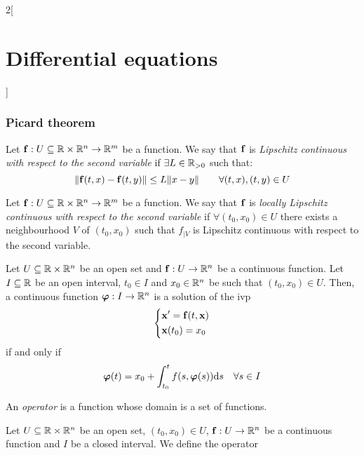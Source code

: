 \documentclass[../../../main.tex]{subfiles}
\begin{document}
\begin{multicols}{2}[\section{Differential equations}]
  \subsubsection*{Picard theorem}
  \begin{definition}
    Let $\boldsymbol{\mathrm{f}}:U\subseteq\mathbb{R}\times\mathbb{R}^n\rightarrow\mathbb{R}^m$ be a function. We say that $\boldsymbol{\mathrm{f}}$ is \textit{Lipschitz continuous with respect to the second variable} if $\exists L\in\mathbb{R}_{>0}$ such that: $$\|\boldsymbol{\mathrm{f}}(t,x)-\boldsymbol{\mathrm{f}}(t,y)\|\leq L\|x-y\|\qquad\forall (t,x),(t,y)\in U$$
  \end{definition}
  \begin{definition}
    Let $\boldsymbol{\mathrm{f}}:U\subseteq\mathbb{R}\times\mathbb{R}^n\rightarrow\mathbb{R}^m$ be a function. We say that $\boldsymbol{\mathrm{f}}$ is \textit{locally Lipschitz continuous with respect to the second variable} if $\forall (t_0,x_0)\in U$ there exists a neighbourhood $V$ of $(t_0,x_0)$ such that $f_{|V}$ is Lipschitz continuous with respect to the second variable.
  \end{definition}
  \begin{prop}
    Let $U\subseteq\mathbb{R}\times\mathbb{R}^n$ be an open set and $\boldsymbol{\mathrm{f}}:U\rightarrow\mathbb{R}^n$ be a continuous function. Let $I\subseteq\mathbb{R}$ be an open interval, $t_0\in I$ and $x_0\in\mathbb{R}^n$ be such that $(t_0,x_0)\in U$. Then, a continuous function $\boldsymbol{\mathrm{\varphi}}:I\rightarrow\mathbb{R}^n$ is a solution of the ivp
    \begin{equation}
      \left\{
      \begin{aligned}
         & \boldsymbol{\mathrm{x}}'=\boldsymbol{\mathrm{f}}(t,\boldsymbol{\mathrm{x}}) \\
         & \boldsymbol{\mathrm{x}}(t_0)=x_0
      \end{aligned}
      \right.
      \label{DE_ivp}
    \end{equation}
    if and only if $$\boldsymbol{\mathrm{\varphi}}(t)=x_0+\int_{t_0}^tf(s,\boldsymbol{\mathrm{\varphi}}(s))\dd s\quad\forall s\in I$$
  \end{prop}
  \begin{definition}
    An \textit{operator} is a function whose domain is a set of functions.
  \end{definition}
  \begin{definition}
    Let $U\subseteq\mathbb{R}\times\mathbb{R}^n$ be an open set, $(t_0,x_0)\in U$, $\boldsymbol{\mathrm{f}}:U\rightarrow\mathbb{R}^n$ be a continuous function and $I$ be a closed interval. We define the operator
    \begin{align*}

\end{align*}
\end{definition}
\end{multicols}
\end{document}
